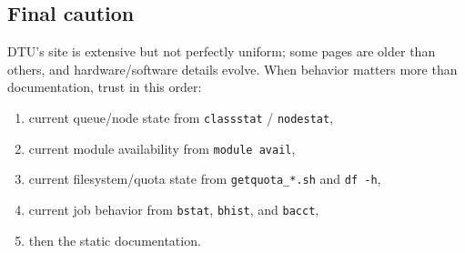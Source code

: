 \documentclass[11pt,a4paper]{article}
\begin{document}
\subsection{Final caution}

DTU's site is extensive but not perfectly uniform; some pages are older than others, and hardware/software details evolve. When behavior matters more than documentation, trust in this order:

\begin{enumerate}[leftmargin=1.5em]
  \item current queue/node state from \texttt{classstat} / \texttt{nodestat},
  \item current module availability from \texttt{module avail},
  \item current filesystem/quota state from \texttt{getquota\_*.sh} and \texttt{df -h},
  \item current job behavior from \texttt{bstat}, \texttt{bhist}, and \texttt{bacct},
  \item then the static documentation.
\end{enumerate}
\end{document}
